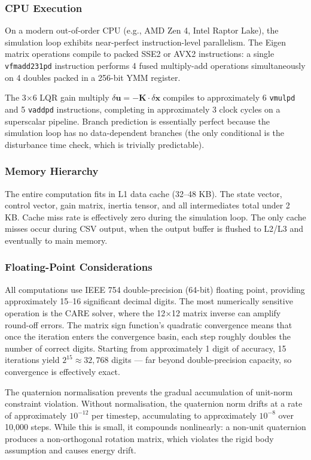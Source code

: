 \documentclass[12pt, a4paper]{article}
\newcommand{\bx}{\bm{x}}
\newcommand{\bu}{\bm{u}}
\newcommand{\bK}{\bm{K}}
\begin{document}
\subsubsection{CPU Execution}

On a modern out-of-order CPU (e.g., AMD Zen 4, Intel Raptor Lake), the simulation loop exhibits near-perfect instruction-level parallelism.  The Eigen matrix operations compile to packed SSE2 or AVX2 instructions: a single \texttt{vfmadd231pd} instruction performs 4 fused multiply-add operations simultaneously on 4 doubles packed in a 256-bit YMM register.

The 3$\times$6 LQR gain multiply $\delta\bu = -\bK \cdot \delta\bx$ compiles to approximately 6 \texttt{vmulpd} and 5 \texttt{vaddpd} instructions, completing in approximately 3 clock cycles on a superscalar pipeline.  Branch prediction is essentially perfect because the simulation loop has no data-dependent branches (the only conditional is the disturbance time check, which is trivially predictable).

\subsubsection{Memory Hierarchy}

The entire computation fits in L1 data cache (32--48 KB).  The state vector, control vector, gain matrix, inertia tensor, and all intermediates total under 2 KB.  Cache miss rate is effectively zero during the simulation loop.  The only cache misses occur during CSV output, when the output buffer is flushed to L2/L3 and eventually to main memory.

\subsubsection{Floating-Point Considerations}

All computations use IEEE 754 double-precision (64-bit) floating point, providing approximately 15--16 significant decimal digits.  The most numerically sensitive operation is the CARE solver, where the 12$\times$12 matrix inverse can amplify round-off errors.  The matrix sign function's quadratic convergence means that once the iteration enters the convergence basin, each step roughly doubles the number of correct digits.  Starting from approximately 1 digit of accuracy, 15 iterations yield $2^{15} \approx 32{,}768$ digits --- far beyond double-precision capacity, so convergence is effectively exact.

The quaternion normalisation prevents the gradual accumulation of unit-norm constraint violation.  Without normalisation, the quaternion norm drifts at a rate of approximately $10^{-12}$ per timestep, accumulating to approximately $10^{-8}$ over 10{,}000 steps.  While this is small, it compounds nonlinearly: a non-unit quaternion produces a non-orthogonal rotation matrix, which violates the rigid body assumption and causes energy drift.
\end{document}
